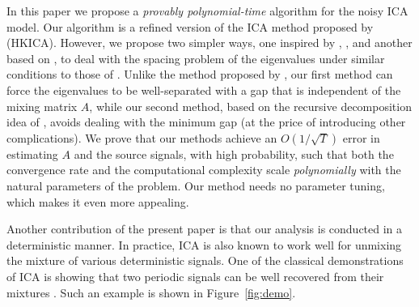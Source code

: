 \documentclass[twoside,11pt]{article}
\begin{document}
In this paper we propose a \emph{provably polynomial-time} algorithm for the noisy ICA model.
Our algorithm is a refined version of the ICA method proposed by \cite{hsu2013learning} (HKICA). 
However, we propose two simpler ways, one inspired by \citet{frieze1996learning}, \citet{arora2012provable}, and another based on \citet{vempala2014max}, to deal with the spacing problem of the eigenvalues under similar conditions to those of \citet{goyal2014fourier}.
Unlike the method proposed by \citet{goyal2014fourier}, our first method can force the eigenvalues to be well-separated with a gap that is independent of the mixing matrix $A$, while our second method, based on the recursive decomposition idea of \citet{vempala2014max}, avoids dealing with the minimum gap (at the price of introducing other complications).
We prove that our methods achieve an $O(1/\sqrt{T})$ error in estimating $A$ and the source signals, with high probability, such that both the convergence rate and the computational complexity scale \emph{polynomially} with the natural parameters of the problem. %
Our method needs no parameter tuning, which makes it even more appealing. %


Another contribution of the present paper is that our analysis is conducted in a deterministic manner. 
In practice, ICA is also known to work well for unmixing the mixture of various deterministic signals. 
One of the classical demonstrations of ICA is showing that two periodic signals can be well recovered from their mixtures \citep{HyvOja00}.
Such an example is shown in Figure~\ref{fig:demo}. 
\end{document}
